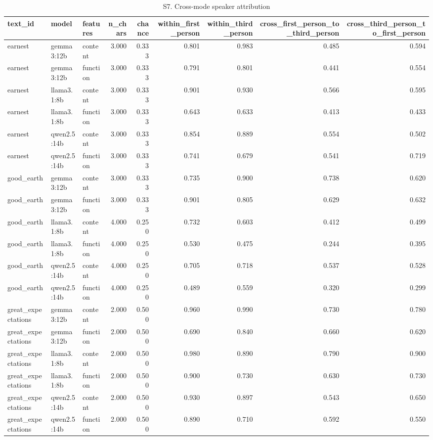 \documentclass[10pt]{article}
\begin{document}
{\scriptsize
\begin{longtable}{lllrrrrrr}
\caption{S7. Cross-mode speaker attribution}\\
\toprule
text\_id & model & features & n\_chars & chance & within\_first\_person & within\_third\_person & cross\_first\_person\_to\_third\_person & cross\_third\_person\_to\_first\_person \\
\midrule
\endhead
earnest & gemma3:12b & content & 3.000 & 0.333 & 0.801 & 0.983 & 0.485 & 0.594 \\
earnest & gemma3:12b & function & 3.000 & 0.333 & 0.791 & 0.801 & 0.441 & 0.554 \\
earnest & llama3.1:8b & content & 3.000 & 0.333 & 0.901 & 0.930 & 0.566 & 0.595 \\
earnest & llama3.1:8b & function & 3.000 & 0.333 & 0.643 & 0.633 & 0.413 & 0.433 \\
earnest & qwen2.5:14b & content & 3.000 & 0.333 & 0.854 & 0.889 & 0.554 & 0.502 \\
earnest & qwen2.5:14b & function & 3.000 & 0.333 & 0.741 & 0.679 & 0.541 & 0.719 \\
good\_earth & gemma3:12b & content & 3.000 & 0.333 & 0.735 & 0.900 & 0.738 & 0.620 \\
good\_earth & gemma3:12b & function & 3.000 & 0.333 & 0.901 & 0.805 & 0.629 & 0.632 \\
good\_earth & llama3.1:8b & content & 4.000 & 0.250 & 0.732 & 0.603 & 0.412 & 0.499 \\
good\_earth & llama3.1:8b & function & 4.000 & 0.250 & 0.530 & 0.475 & 0.244 & 0.395 \\
good\_earth & qwen2.5:14b & content & 4.000 & 0.250 & 0.705 & 0.718 & 0.537 & 0.528 \\
good\_earth & qwen2.5:14b & function & 4.000 & 0.250 & 0.489 & 0.559 & 0.320 & 0.299 \\
great\_expectations & gemma3:12b & content & 2.000 & 0.500 & 0.960 & 0.990 & 0.730 & 0.780 \\
great\_expectations & gemma3:12b & function & 2.000 & 0.500 & 0.690 & 0.840 & 0.660 & 0.620 \\
great\_expectations & llama3.1:8b & content & 2.000 & 0.500 & 0.980 & 0.890 & 0.790 & 0.900 \\
great\_expectations & llama3.1:8b & function & 2.000 & 0.500 & 0.900 & 0.730 & 0.630 & 0.730 \\
great\_expectations & qwen2.5:14b & content & 2.000 & 0.500 & 0.930 & 0.897 & 0.543 & 0.650 \\
great\_expectations & qwen2.5:14b & function & 2.000 & 0.500 & 0.890 & 0.710 & 0.592 & 0.550 \\

\end{longtable}}
\end{document}
